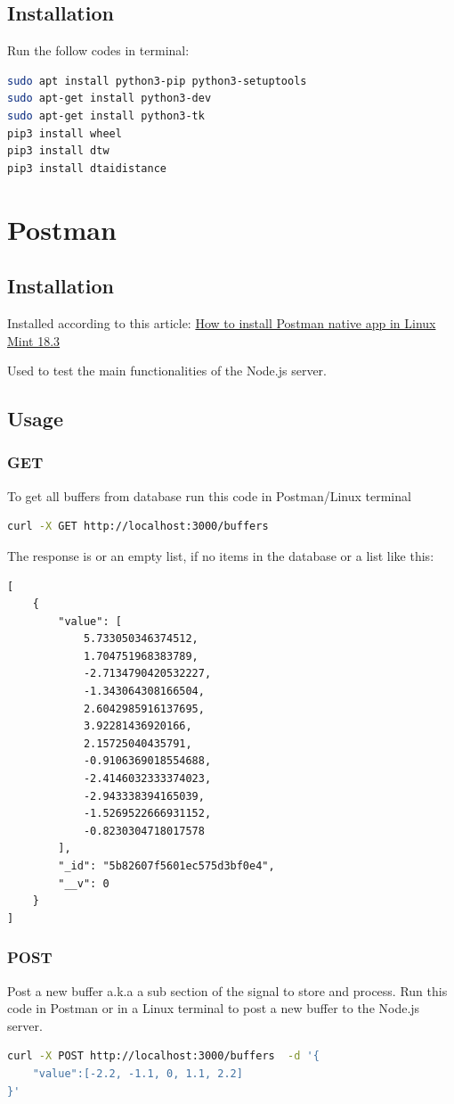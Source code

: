 \documentclass[12pt, a4paper, portrait]{article}
\begin{document}
\subsection{Installation}
Run the follow codes in terminal:
\begin{lstlisting}[language=bash]
sudo apt install python3-pip python3-setuptools
sudo apt-get install python3-dev
sudo apt-get install python3-tk
pip3 install wheel
pip3 install dtw
pip3 install dtaidistance

\end{lstlisting}

\pagebreak
\section{Postman}
\subsection{Installation}
Installed according to this article: \href{https://r00t4bl3.com/post/how-to-install-postman-native-app-in-linux-mint-18-3-sylvia}{How to install Postman native app in Linux Mint 18.3}

Used to test the main functionalities of the Node.js server.

\subsection{Usage}
\subsubsection{GET}
To get all buffers from database run this code in Postman/Linux terminal
\begin{lstlisting}[language=bash, caption=Get all buffers]
curl -X GET http://localhost:3000/buffers
\end{lstlisting}

The response is or an empty list, if no items in the database or a list like this:
\begin{lstlisting}[language=XML, caption=A sub section of the signal to process]
[
    {
        "value": [
            5.733050346374512,
            1.704751968383789,
            -2.7134790420532227,
            -1.343064308166504,
            2.6042985916137695,
            3.92281436920166,
            2.15725040435791,
            -0.9106369018554688,
            -2.4146032333374023,
            -2.943338394165039,
            -1.5269522666931152,
            -0.8230304718017578
        ],
        "_id": "5b82607f5601ec575d3bf0e4",
        "__v": 0
    }
]
\end{lstlisting}

\subsubsection{POST}
Post a new buffer a.k.a a sub section of the signal to store and process. Run this code in Postman or in a Linux terminal to post a new buffer to the Node.js server.
\begin{lstlisting}[language=bash, caption=Send signal data via REST]
curl -X POST http://localhost:3000/buffers  -d '{
	"value":[-2.2, -1.1, 0, 1.1, 2.2]
}'
\end{lstlisting}
\end{document}
